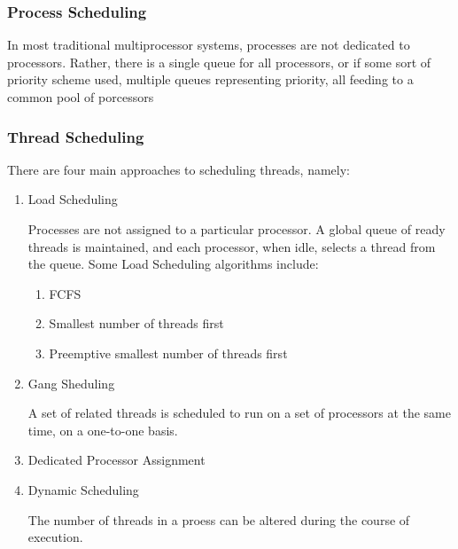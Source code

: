 \documentclass[11pt]{article}
\begin{document}
\subsubsection{Process Scheduling}
\label{sec:orgheadline103}

In most traditional multiprocessor systems, processes are not dedicated
to processors. Rather, there is a single queue for all processors, or if
some sort of priority scheme used, multiple queues representing priority,
all feeding to a common pool of porcessors

\subsubsection{Thread Scheduling}
\label{sec:orgheadline111}

There are four main approaches to scheduling threads, namely:

\begin{enumerate}
\item Load Scheduling
\label{sec:orgheadline107}

Processes are not assigned to a particular processor. A global queue of
ready threads is maintained, and each processor, when idle, selects a
thread from the queue. Some Load Scheduling algorithms include:

\begin{enumerate}
\item FCFS
\label{sec:orgheadline104}

\item Smallest number of threads first
\label{sec:orgheadline105}

\item Preemptive smallest number of threads first
\label{sec:orgheadline106}
\end{enumerate}

\item Gang Sheduling
\label{sec:orgheadline108}

A set of related threads is scheduled to run on a set of processors at
the same time, on a one-to-one basis.

\item Dedicated Processor Assignment
\label{sec:orgheadline109}



\item Dynamic Scheduling
\label{sec:orgheadline110}

The number of threads in a proess can be altered during the course
of execution.
\end{enumerate}
\end{document}
